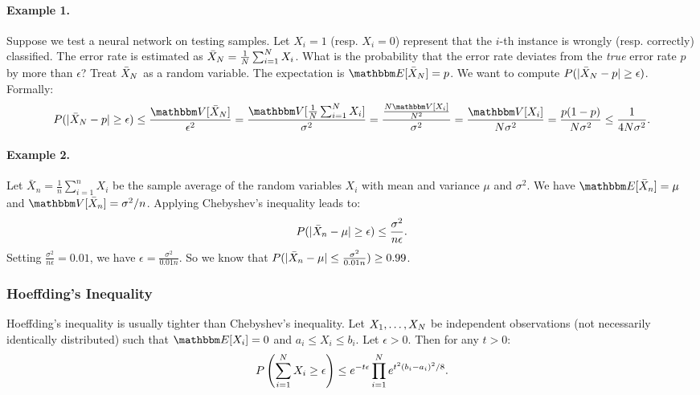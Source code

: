     \paragraph{Example 1.}
    Suppose we test a neural network on \ndata testing samples.
    Let $X_i=1$ (resp. $X_i = 0$) represent that the $i$-th instance is wrongly (resp. correctly) classified.
    The error rate is estimated as $\bar{X}_N = \frac{1}{N} \sum_{i=1}^{N}{X_i}$.
    What is the probability that the error rate deviates from the \emph{true} error rate $p$ by more than $\epsilon$?
    Treat $\bar{X}_N$ as a random variable.
    The expectation is $\E[\bar{X}_\ndata] = p$.
    We want to compute $P(| \bar{X}_N - p | \ge \epsilon)$.
    Formally:
        \begin{equation}
            P(\Abs{\bar{X}_\ndata - p} \ge \epsilon) \le \frac{\Var[\bar{X}_\ndata]}{\epsilon^2} = \frac{\Var[\frac{1}{\ndata} \sum_{i=1}^{\ndata}{X_i}]}{\sigma^2} = \frac{\frac{\ndata \Var[X_i]}{\ndata^2}}{\sigma^2} = \frac{\Var[X_i]}{\ndata \sigma^2} = \frac{p (1 - p)}{N \sigma^2} \le \frac{1}{4\ndata \sigma^2}.
        \end{equation}

    \paragraph{Example 2.}
    Let $\bar{X}_n = \frac{1}{n}\sum_{i=1}^{n}{X_i}$ be the sample average of the random variables $X_i$ with mean and variance $\mu$ and $\sigma^2$.
    We have $\E[\bar{X}_n] = \mu$ and $\Var[\bar{X}_n]=\sigma^2/n$.
    Applying Chebyshev's inequality leads to:
        \begin{equation}
            P(| \bar{X}_n - \mu | \ge \epsilon) \le \frac{\sigma^2}{n\epsilon}.
        \end{equation}
    Setting $\frac{\sigma^2}{n\epsilon} = 0.01$, we have $\epsilon = \frac{\sigma^2}{0.01 n}$.
    So we know that $P(| \bar{X}_n - \mu | \le \frac{\sigma^2}{0.01 n}) \ge 0.99$.
    
    
    
    \subsubsection{Hoeffding's Inequality}
        Hoeffding's inequality is usually tighter than Chebyshev's inequality.
        Let $X_1, \ldots, X_N$ be independent observations (not necessarily identically distributed) such that $\E[X_i] = 0$ and $a_i \le X_i \le b_i$.
        Let $\epsilon > 0$.
        Then for any $t > 0$:
            \begin{equation}
                P\left( \sum_{i=1}^{N}{X_i} \ge \epsilon \right) \le e^{-t\epsilon} \prod_{i=1}^{N}{e^{t^2(b_i-a_i)^2/8} }.
            \end{equation}


